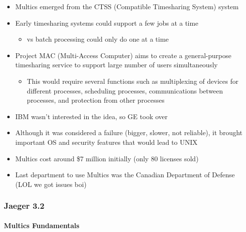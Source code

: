 \documentclass[
  12pt]{findlay}
\providecommand{\tightlist}{%
  \setlength{\itemsep}{0pt}\setlength{\parskip}{0pt}}
\begin{document}
\begin{itemize}
\tightlist
\item
  Multics emerged from the CTSS (Compatible Timesharing System) system
\item
  Early timesharing systems could support a few jobs at a time

  \begin{itemize}
  \tightlist
  \item
    vs batch processing could only do one at a time
  \end{itemize}
\item
  Project MAC (Multi-Access Computer) aims to create a general-purpose
  timesharing service to support large number of users simultaneously

  \begin{itemize}
  \tightlist
  \item
    This would require several functions such as multiplexing of devices
    for different processes, scheduling processes, communications
    between processes, and protection from other processes
  \end{itemize}
\item
  IBM wasn't interested in the idea, so GE took over
\item
  Although it was considered a failure (bigger, slower, not reliable),
  it brought important OS and security features that would lead to UNIX
\item
  Multics cost around \$7 million initially (only 80 licenses sold)
\item
  Last department to use Multics was the Canadian Department of Defense
  (LOL we got issues boi)
\end{itemize}

\hypertarget{jaeger-3.2}{%
\subsubsection{Jaeger 3.2}\label{jaeger-3.2}}

\hypertarget{multics-fundamentals}{%
\paragraph{Multics Fundamentals}\label{multics-fundamentals}}
\end{document}
